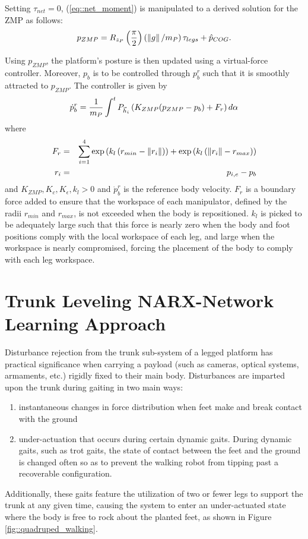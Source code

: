 		Setting $\tau_{net}=0$, (\ref{eq::net_moment}) is manipulated to a derived solution for the ZMP as follows:
			\begin{equation}
				{p}_{ZMP} = R_{z_P} \left(\frac{\pi}{2}\right)  \left( \left\lVert g\right\rVert/m_{P}\right) \tau_{legs} + \hat{p}_{COG}.
				\label{eq::ZMPFromMoment}
			\end{equation}

		Using ${p}_{ZMP}$, the platform's posture is then updated using a virtual-force controller. Moreover, ${p}_{b}$ is to be controlled through  ${p}_{b}^{r}$ such that it is smoothly attracted to ${p}_{ZMP}$. The controller is given by
			\begin{equation}
				\dot{p}_{b}^{r} 	= \frac{1}{m_{P}} \int^{t} {P}_{\vec{h}_{i}} \left(K_{ZMP}	( {p}_{ZMP} - {p}_{b} )  
				+ F_{r} \right) d\alpha
				\label{eq::ZMPController}
			\end{equation}	
		where
			\begin{eqnarray*}
				F_{r} 	& = &  \sum_{i=1}^{4} \exp \left(k_{l} \left(r_{min} -  \left\lVert r_{i}\right\rVert\right)\right) + \exp \left(k_{l} \left( \left\lVert r_{i}\right\rVert - r_{max}\right)\right) \nonumber \\
				r_{i}	& = & {p}_{i,e}- {p}_{b} \nonumber
			\end{eqnarray*}
		and $K_{ZMP}, K_{c}, K_{\epsilon}, k_{l} > 0$ and $\dot{p}_{b}^{r}$ is the reference body velocity. $F_{r}$ is a boundary force added to ensure that the workspace of each manipulator, defined by the radii $r_{min}$ and $r_{max}$, is not exceeded when the body is repositioned. $k_{l}$ is picked to be adequately large such that this force is nearly zero when the body and foot positions comply with the local workspace of each leg, and large when the workspace is nearly compromised, forcing the placement of the body to comply with each leg workspace.





	\section{Trunk Leveling NARX-Network Learning Approach}

		Disturbance rejection from the trunk sub-system of a legged platform has practical significance when carrying a payload (such as cameras, optical systems, armaments, etc.) rigidly fixed to their main body. Disturbances are imparted upon the trunk during gaiting in two main ways: 
\begin{enumerate}
\item instantaneous changes in force distribution when feet make and break contact with the ground \item under-actuation that occurs during certain dynamic gaits. During dynamic gaits, such as trot gaits, the state of contact between the feet and the ground is changed often so as to prevent the walking robot from tipping past a recoverable configuration. 
\end{enumerate}
Additionally, these gaits feature the utilization of two or fewer legs to support the trunk at any given time, causing the system to enter an under-actuated state where the body is free to rock about the planted feet, as shown in Figure \ref{fig::quadruped_walking}.

